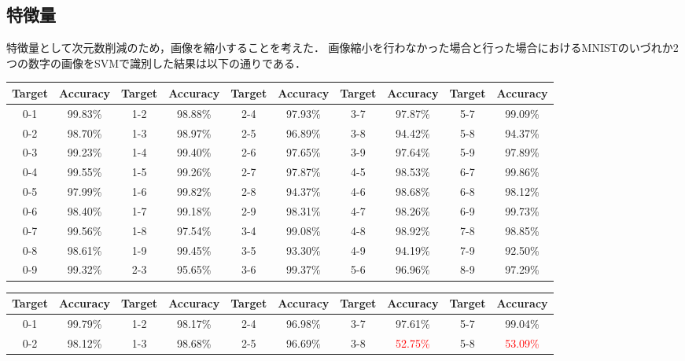 \subsection*{特徴量}
特徴量として次元数削減のため，画像を縮小することを考えた．
画像縮小を行わなかった場合と行った場合におけるMNISTのいづれか2つの数字の画像をSVMで識別した結果は以下の通りである．
\begin{table}[H]
    \begin{center}
        \begin{tabular}{|c|c||c|c||c|c||c|c||c|c|}
            \hline
            Target & Accuracy & Target & Accuracy & Target & Accuracy & Target & Accuracy & Target & Accuracy\\
            \hline \hline
            0-1 & 99.83\% & 1-2 & 98.88\% & 2-4 & 97.93\% & 3-7 & 97.87\% & 5-7 & 99.09\%\\
            0-2 & 98.70\% & 1-3 & 98.97\% & 2-5 & 96.89\% & 3-8 & 94.42\% & 5-8 & 94.37\%\\
            0-3 & 99.23\% & 1-4 & 99.40\% & 2-6 & 97.65\% & 3-9 & 97.64\% & 5-9 & 97.89\%\\
            0-4 & 99.55\% & 1-5 & 99.26\% & 2-7 & 97.87\% & 4-5 & 98.53\% & 6-7 & 99.86\%\\
            0-5 & 97.99\% & 1-6 & 99.82\% & 2-8 & 94.37\% & 4-6 & 98.68\% & 6-8 & 98.12\%\\
            0-6 & 98.40\% & 1-7 & 99.18\% & 2-9 & 98.31\% & 4-7 & 98.26\% & 6-9 & 99.73\%\\
            0-7 & 99.56\% & 1-8 & 97.54\% & 3-4 & 99.08\% & 4-8 & 98.92\% & 7-8 & 98.85\%\\
            0-8 & 98.61\% & 1-9 & 99.45\% & 3-5 & 93.30\% & 4-9 & 94.19\% & 7-9 & 92.50\%\\
            0-9 & 99.32\% & 2-3 & 95.65\% & 3-6 & 99.37\% & 5-6 & 96.96\% & 8-9 & 97.29\%\\
            \hline
        \end{tabular}
    \end{center}
    \begin{center}
        \begin{tabular}{|c|c||c|c||c|c||c|c||c|c|}
            \hline
            Target & Accuracy & Target & Accuracy & Target & Accuracy & Target & Accuracy & Target & Accuracy\\
            \hline \hline
            0-1 & 99.79\% & 1-2 & 98.17\% & 2-4 & 96.98\% & 3-7 & 97.61\% & 5-7 & 99.04\%\\
            0-2 & 98.12\% & 1-3 & 98.68\% & 2-5 & 96.69\% & 3-8 & \textcolor{red}{52.75\%} & 5-8 & \textcolor{red}{53.09\%}\\

\end{tabular}
\end{center}
\end{table}
